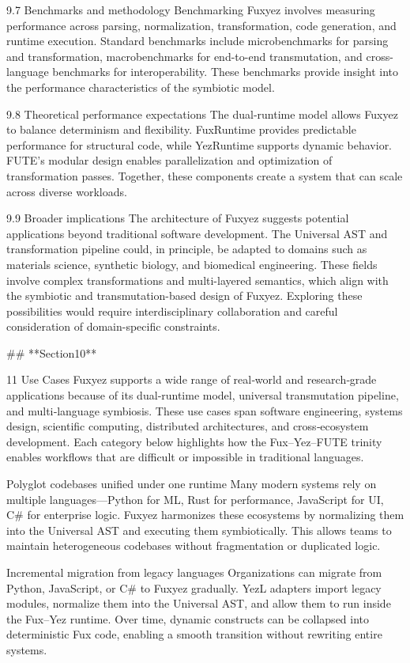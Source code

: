 9.7 Benchmarks and methodology
Benchmarking Fuxyez involves measuring performance across parsing, normalization, transformation, code generation, and runtime execution. Standard benchmarks include microbenchmarks for parsing and transformation, macrobenchmarks for end-to-end transmutation, and cross-language benchmarks for interoperability. These benchmarks provide insight into the performance characteristics of the symbiotic model.

9.8 Theoretical performance expectations
The dual‑runtime model allows Fuxyez to balance determinism and flexibility. FuxRuntime provides predictable performance for structural code, while YezRuntime supports dynamic behavior. FUTE’s modular design enables parallelization and optimization of transformation passes. Together, these components create a system that can scale across diverse workloads.

9.9 Broader implications
The architecture of Fuxyez suggests potential applications beyond traditional software development. The Universal AST and transformation pipeline could, in principle, be adapted to domains such as materials science, synthetic biology, and biomedical engineering. These fields involve complex transformations and multi-layered semantics, which align with the symbiotic and transmutation-based design of Fuxyez. Exploring these possibilities would require interdisciplinary collaboration and careful consideration of domain-specific constraints.

## **Section10**

11 Use Cases
Fuxyez supports a wide range of real‑world and research‑grade applications because of its dual‑runtime model, universal transmutation pipeline, and multi‑language symbiosis. These use cases span software engineering, systems design, scientific computing, distributed architectures, and cross‑ecosystem development. Each category below highlights how the Fux–Yez–FUTE trinity enables workflows that are difficult or impossible in traditional languages.

Polyglot codebases unified under one runtime
Many modern systems rely on multiple languages—Python for ML, Rust for performance, JavaScript for UI, C# for enterprise logic. Fuxyez harmonizes these ecosystems by normalizing them into the Universal AST and executing them symbiotically. This allows teams to maintain heterogeneous codebases without fragmentation or duplicated logic.

Incremental migration from legacy languages
Organizations can migrate from Python, JavaScript, or C# to Fuxyez gradually. YezL adapters import legacy modules, normalize them into the Universal AST, and allow them to run inside the Fux–Yez runtime. Over time, dynamic constructs can be collapsed into deterministic Fux code, enabling a smooth transition without rewriting entire systems.

